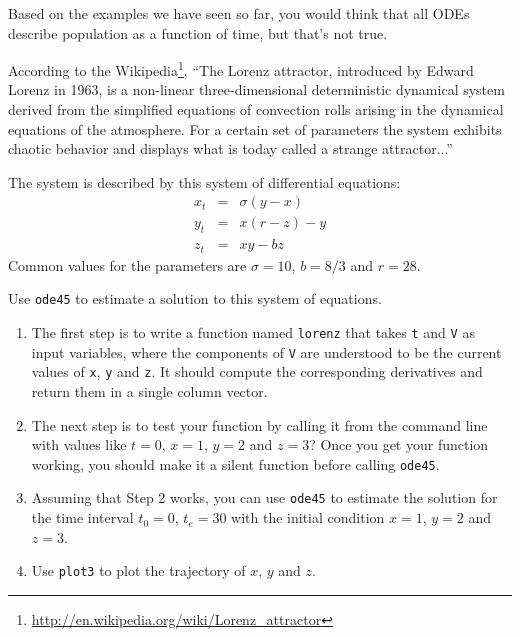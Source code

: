 \begin{ex}

Based on the examples we have seen so far, you would think that
all ODEs describe population as
a function of time, but that's not true.

According to the
Wikipedia\footnote{\url{http://en.wikipedia.org/wiki/Lorenz_attractor}},
``The Lorenz attractor, introduced by Edward Lorenz in 1963, is a
non-linear three-dimensional deterministic dynamical system derived
from the simplified equations of convection rolls arising in the
dynamical equations of the atmosphere. For a certain set of parameters
the system exhibits chaotic behavior and displays what is today called
a strange attractor...''

The system is described by this system of differential equations:
%
\begin{eqnarray}
x_t &=& \sigma (y - x) \\
y_t &=& x (r - z) - y  \\
z_t &=& xy - b z
\end{eqnarray}
%
Common values for the parameters are $\sigma = 10$, $b = 8/3$ and $r=28$.

Use {\tt ode45} to estimate a solution to this
system of equations. 


\begin{enumerate}

\item The first step is to write a function named {\tt lorenz} that
takes {\tt t} and {\tt V} as input variables, where the components
of {\tt V} are understood to be the current values of {\tt x},
{\tt y} and {\tt z}. It should compute the corresponding derivatives
and return them in a single column vector.

\item The next step is to test your function by calling it from
the command line with values like
$t=0$, $x=1$, $y=2$ and $z=3$? Once you get your function working,
you should make it a silent function before calling {\tt ode45}.

\item Assuming that Step 2 works, you can use {\tt ode45}
to estimate the solution for the time interval $t_0 = 0$, $t_e = 30$
with the initial condition $x=1$, $y=2$ and $z=3$.

\item Use {\tt plot3} to plot the trajectory of
$x$, $y$ and $z$.

\end{enumerate}

\end{ex}
